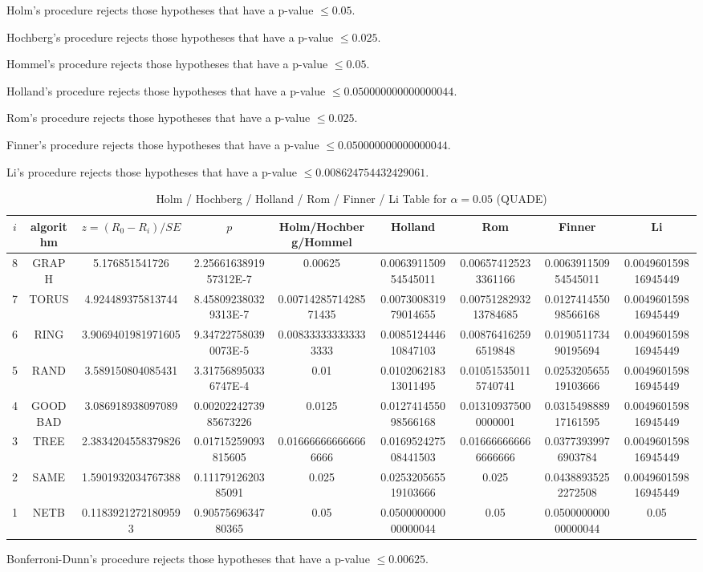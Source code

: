\documentclass[a4paper,10pt]{article}
\begin{document}
\begin{landscape}
Holm's procedure rejects those hypotheses that have a p-value $\le0.05$.


Hochberg's procedure rejects those hypotheses that have a p-value $\le0.025$.


Hommel's procedure rejects those hypotheses that have a p-value $\le0.05$.


Holland's procedure rejects those hypotheses that have a p-value $\le0.050000000000000044$.


Rom's procedure rejects those hypotheses that have a p-value $\le0.025$.


Finner's procedure rejects those hypotheses that have a p-value $\le0.050000000000000044$.


Li's procedure rejects those hypotheses that have a p-value $\le0.008624754432429061$.



\newpage

\begin{table}[!htp]
\centering\scriptsize
\caption{Holm / Hochberg / Holland / Rom / Finner / Li Table for $\alpha=0.05$ (QUADE)}
\begin{tabular}{ccccccccc}
$i$&algorithm&$z=(R_0 - R_i)/SE$&$p$&Holm/Hochberg/Hommel&Holland&Rom&Finner&Li\\
\hline
8& GRAPH&5.176851541726&2.2566163891957312E-7&0.00625&0.006391150954545011&0.006574125233361166&0.006391150954545011&0.004960159816945449\\
7& TORUS&4.924489375813744&8.458092380329313E-7&0.0071428571428571435&0.007300831979014655&0.0075128293213784685&0.012741455098566168&0.004960159816945449\\
6& RING&3.9069401981971605&9.347227580390073E-5&0.008333333333333333&0.008512444610847103&0.008764162596519848&0.019051173490195694&0.004960159816945449\\
5& RAND&3.589150804085431&3.317568950336747E-4&0.01&0.010206218313011495&0.010515350115740741&0.025320565519103666&0.004960159816945449\\
4& GOODBAD&3.086918938097089&0.0020224273985673226&0.0125&0.012741455098566168&0.013109375000000001&0.031549888917161595&0.004960159816945449\\
3& TREE&2.3834204558379826&0.01715259093815605&0.016666666666666666&0.016952427508441503&0.016666666666666666&0.03773939976903784&0.004960159816945449\\
2& SAME&1.5901932034767388&0.1117912620385091&0.025&0.025320565519103666&0.025&0.04388935252272508&0.004960159816945449\\
1& NETB&0.11839212721809593&0.9057569634780365&0.05&0.050000000000000044&0.05&0.050000000000000044&0.05\\
\hline
\end{tabular}
\end{table}
Bonferroni-Dunn's procedure rejects those hypotheses that have a p-value $\le0.00625$.



\end{landscape}
\end{document}
